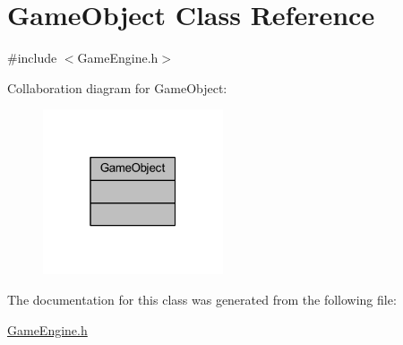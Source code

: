 \hypertarget{class_game_object}{}\section{Game\+Object Class Reference}
\label{class_game_object}


{\ttfamily \#include $<$Game\+Engine.\+h$>$}



Collaboration diagram for Game\+Object\+:
\nopagebreak
\begin{figure}[H]
\begin{center}
\leavevmode
\includegraphics[width=151pt]{class_game_object__coll__graph}
\end{center}
\end{figure}


The documentation for this class was generated from the following file\+:\begin{DoxyCompactItemize}
\item 
\mbox{\hyperlink{_game_engine_8h}{Game\+Engine.\+h}}\end{DoxyCompactItemize}
